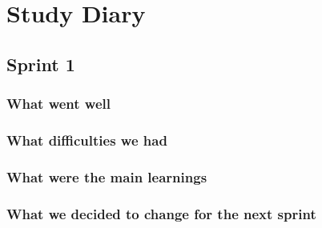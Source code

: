 \section{Study Diary}

\subsection{Sprint 1}
\subsubsection{What went well}
\subsubsection{What difficulties we had}
\subsubsection{What were the main learnings}
\subsubsection{What we decided to change for the next sprint}
